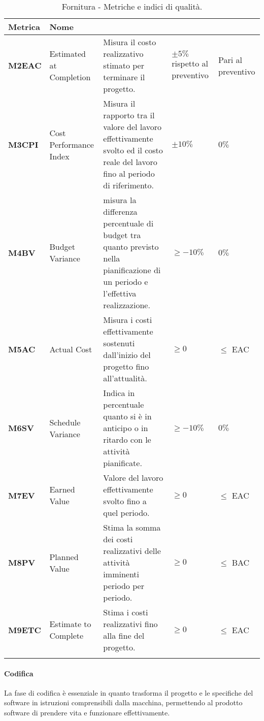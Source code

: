 \hspace{1pt}
    \begin{longtable}{|C{1.5cm}|L{3cm}|L{4cm}|L{2.5cm}|L{2.5cm}|}
        \hline
        \textbf{Metrica} & \textbf{Nome} & \textbf{} & \textbf{} & \textbf{} \\
        \hline
        \textbf{M2EAC} & Estimated at Completion &  Misura il costo realizzativo stimato per terminare il progetto.  & $\pm 5\%$ rispetto al preventivo & Pari al preventivo \\
        \hline
        \textbf{M3CPI} & Cost Performance Index & Misura il rapporto tra il valore del lavoro effettivamente svolto ed il 
        costo reale del lavoro fino al periodo di riferimento. & $\pm 10\%$ & $0\%$ \\
        \hline
        \textbf{M4BV} & Budget Variance & misura la differenza percentuale di budget tra quanto previsto nella 
        pianificazione di un periodo e l’effettiva realizzazione. & $\geq -10\%$ & $0\%$ \\
        \hline
        \textbf{M5AC} & Actual Cost & Misura i costi effettivamente sostenuti dall’inizio del progetto fino 
        all’attualità.
         & $\geq 0 $ & $ \leq$ EAC  \\
        \hline
        \textbf{M6SV} & Schedule Variance & Indica in percentuale quanto si è in anticipo o in ritardo con le attività
        pianificate. & $\geq -10\%$ & $0\%$ \\
        \hline
        \textbf{M7EV} & Earned Value & Valore del lavoro effettivamente svolto fino a quel periodo.
        & $\geq 0 $ & $\leq$ EAC  \\
        \hline
        \textbf{M8PV} & Planned Value & Stima la somma dei costi realizzativi delle attività imminenti periodo 
        per periodo. & $\geq 0  $ & $ \leq$ BAC  \\
        \hline
        \textbf{M9ETC} & Estimate to Complete &  Stima i costi realizzativi fino alla fine del progetto. & $\geq 0  $ & $ \leq$ EAC  \\
        \hline
    \caption{Fornitura - Metriche e indici di qualità.}
    \label{tab:controllo_progetto}
\end{longtable}

\paragraph{Codifica}
La fase di codifica è essenziale in quanto trasforma il progetto e le specifiche del software in istruzioni comprensibili dalla macchina, permettendo al prodotto software di prendere vita e funzionare effettivamente.

